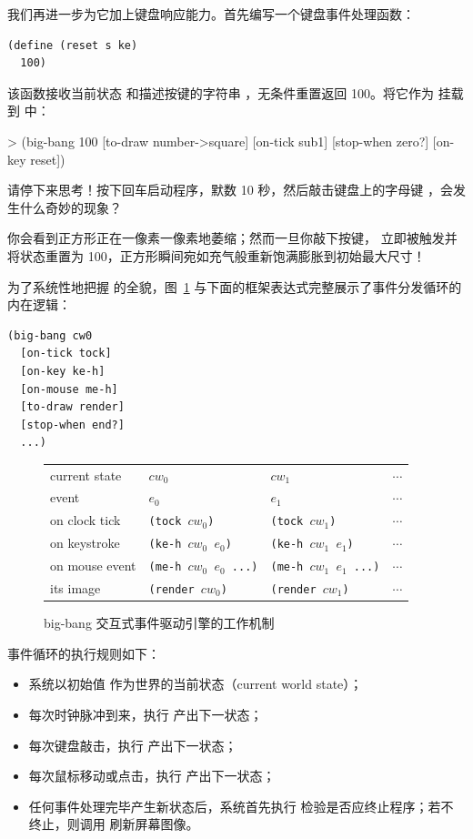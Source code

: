 我们再进一步为它加上键盘响应能力。首先编写一个键盘事件处理函数：
\begin{lstlisting}[language=BSL]
(define (reset s ke)
  100)
\end{lstlisting}
该函数接收当前状态  和描述按键的字符串 ，无条件重置返回 100。将它作为  挂载到  中：
\begin{replbox}
> (big-bang 100
    [to-draw number->square]
    [on-tick sub1]
    [stop-when zero?]
    [on-key reset])
\end{replbox}

请停下来思考！按下回车启动程序，默数 10 秒，然后敲击键盘上的字母键 ，会发生什么奇妙的现象？

你会看到正方形正在一像素一像素地萎缩；然而一旦你敲下按键， 立即被触发并将状态重置为 100，正方形瞬间宛如充气般重新饱满膨胀到初始最大尺寸！

为了系统性地把握  的全貌，图~\ref{fig:ch02_big_bang} 与下面的框架表达式完整展示了事件分发循环的内在逻辑：
\begin{lstlisting}[language=BSL]
(big-bang cw0
  [on-tick tock]
  [on-key ke-h]
  [on-mouse me-h]
  [to-draw render]
  [stop-when end?]
  ...)
\end{lstlisting}

\begin{figure}[htbp]
  \centering
\begin{stepperbox}[unbreakable]
\centering
\scriptsize
\setlength{\tabcolsep}{4pt}
\begin{tabular}{@{}llll@{}}
\toprule
current state & $cw_0$ & $cw_1$ & $\cdots$ \\
event & $e_0$ & $e_1$ & $\cdots$ \\
\midrule
on clock tick & \texttt{(tock $cw_0$)} & \texttt{(tock $cw_1$)} & $\cdots$ \\
on keystroke & \texttt{(ke-h $cw_0$ $e_0$)} & \texttt{(ke-h $cw_1$ $e_1$)} & $\cdots$ \\
on mouse event & \texttt{(me-h $cw_0$ $e_0$ ...)} & \texttt{(me-h $cw_1$ $e_1$ ...)} & $\cdots$ \\
its image & \texttt{(render $cw_0$)} & \texttt{(render $cw_1$)} & $\cdots$ \\
\bottomrule
\end{tabular}
\end{stepperbox}
  \caption{big-bang 交互式事件驱动引擎的工作机制}
  \label{fig:ch02_big_bang}
\end{figure}

事件循环的执行规则如下：
\begin{itemize}
  \item 系统以初始值  作为世界的当前状态（current world state）；
  \item 每次时钟脉冲到来，执行  产出下一状态；
  \item 每次键盘敲击，执行  产出下一状态；
  \item 每次鼠标移动或点击，执行  产出下一状态；
  \item 任何事件处理完毕产生新状态后，系统首先执行  检验是否应终止程序；若不终止，则调用  刷新屏幕图像。
\end{itemize}

